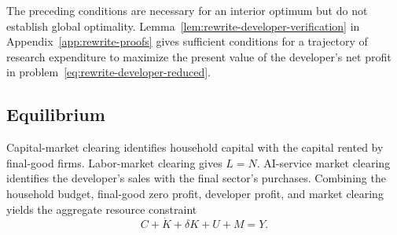 The preceding conditions are necessary for an interior optimum but do not
establish global optimality.
Lemma~\ref{lem:rewrite-developer-verification} in
Appendix~\ref{app:rewrite-proofs} gives sufficient conditions for a trajectory
of research expenditure to maximize the present value of the developer's net profit in
problem~\eqref{eq:rewrite-developer-reduced}.


\subsection{Equilibrium}
\label{subsec:rewrite-equilibrium}

Capital-market clearing
identifies household capital with the capital rented by final-good firms.
Labor-market clearing gives $L=N$. AI-service market clearing identifies the
developer's sales with the final sector's purchases. Combining the household
budget, final-good zero profit, developer profit, and market clearing yields
the aggregate resource constraint
\begin{equation}
 C+\dot K+\delta K+U+M=Y.
 \label{eq:rewrite-resource}
\end{equation}

